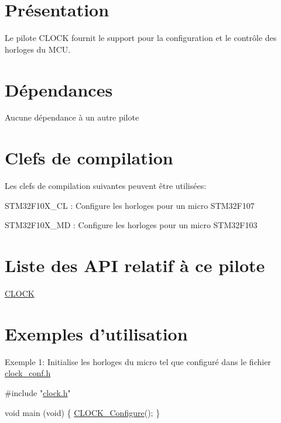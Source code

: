 \hypertarget{clock_CLOCK_intro}{}\section{Présentation}\label{clock_CLOCK_intro}
Le pilote C\+L\+O\+C\+K fournit le support pour la configuration et le contrôle des horloges du M\+C\+U.\hypertarget{clock_CLOCK_dep}{}\section{Dépendances}\label{clock_CLOCK_dep}
Aucune dépendance à un autre pilote\hypertarget{clock_CLOCK_compinfo}{}\section{Clefs de compilation}\label{clock_CLOCK_compinfo}
Les clefs de compilation suivantes peuvent être utilisées\+:
\begin{DoxyItemize}
\item S\+T\+M32\+F10\+X\+\_\+\+C\+L \+: Configure les horloges pour un micro S\+T\+M32\+F107
\item S\+T\+M32\+F10\+X\+\_\+\+M\+D \+: Configure les horloges pour un micro S\+T\+M32\+F103
\end{DoxyItemize}\hypertarget{clock_CLOCK_reference}{}\section{Liste des A\+P\+I relatif à ce pilote}\label{clock_CLOCK_reference}

\begin{DoxyItemize}
\item \hyperlink{group___c_l_o_c_k__driver}{C\+L\+O\+C\+K}
\end{DoxyItemize}\hypertarget{clock_CLOCK_exemples}{}\section{Exemples d'utilisation}\label{clock_CLOCK_exemples}
Exemple 1\+: Initialise les horloges du micro tel que configuré dans le fichier \hyperlink{clock__conf_8h}{clock\+\_\+conf.\+h}


\begin{DoxyCode}
\textcolor{preprocessor}{#include "\hyperlink{clock_8h}{clock.h}"}

\textcolor{keywordtype}{void} main (\textcolor{keywordtype}{void})
\{
   \hyperlink{group___c_l_o_c_k__fonctions_ga955f31a13011ed29d9bc0050eaba9ab4}{CLOCK\_Configure}();
\}
\end{DoxyCode}
 